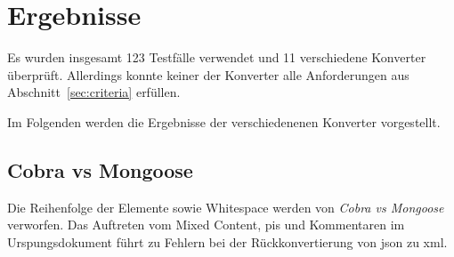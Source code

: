 \chapter{Ergebnisse} \label{chap:results}

\begin{figure}[b!]
    
    \label{tbl:results-basic}
\end{figure}

\begin{figure}[t!]
    
    \label{tbl:results-chars}
\end{figure}

\begin{figure}[t!]
    
    \label{tbl:results-complex}
\end{figure}

\begin{figure}[t!]
    
    \label{tbl:results-sec}
\end{figure}

Es wurden insgesamt 123 Testfälle verwendet und 11 verschiedene Konverter überprüft. Allerdings konnte keiner der Konverter alle Anforderungen aus Abschnitt~\ref{sec:criteria} erfüllen.

Im Folgenden werden die Ergebnisse der verschiedenenen Konverter vorgestellt.


\section{Cobra vs Mongoose}
\label{sec:cobravsmongoose}

Die Reihenfolge der Elemente sowie Whitespace werden von \emph{Cobra vs Mongoose} verworfen. Das Auftreten vom Mixed Content, \glspl{pi} und Kommentaren im Urspungsdokument führt zu Fehlern bei der Rückkonvertierung von \acrshort{json} zu \acrshort{xml}.

